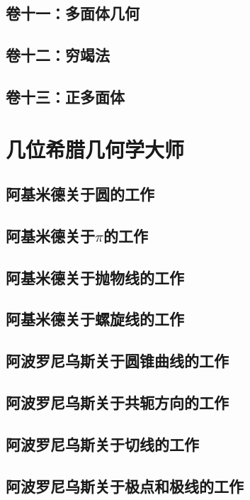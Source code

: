 \documentclass[cn,fancy,blue,11pt]{elegantbook}
\begin{document}
\section{卷十一：多面体几何}

\section{卷十二：穷竭法}

\section{卷十三：正多面体}

\chapter{几位希腊几何学大师}

\section{阿基米德关于圆的工作}

\section{阿基米德关于$\pi$的工作}

\section{阿基米德关于抛物线的工作}

\section{阿基米德关于螺旋线的工作}

\section{阿波罗尼乌斯关于圆锥曲线的工作}

\section{阿波罗尼乌斯关于共轭方向的工作}

\section{阿波罗尼乌斯关于切线的工作}

\section{阿波罗尼乌斯关于极点和极线的工作}
\end{document}
